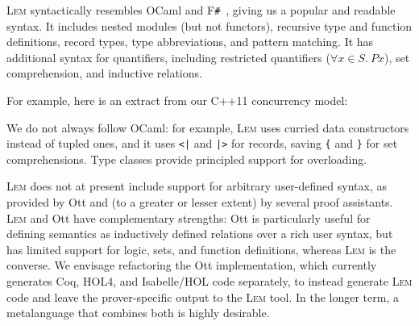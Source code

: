 \documentclass[a4paper]{llncs}
\newcommand{\myparagraph}[1]{\vspace{0.5\baselineskip}\par\noindent{\normalsize\bfseries{#1}}\quad}
\newcommand{\Lem}{\textsc{Lem}}
\begin{document}
\myparagraph{1. Readability of source files}
\Lem{} syntactically resembles OCaml and F\texttt{\#}~\cite{fsharp}, giving us a
popular and readable syntax.  It includes nested modules (but not functors),
recursive type and function definitions, record types, type abbreviations, and
pattern matching.  It has additional syntax for quantifiers, including
restricted quantifiers ($\forall x \in S.\ P x$), set comprehension, and
inductive relations. 

For example, here is an extract from our C++11 concurrency model:
\par{}
\noindent We do not always follow OCaml: for example, \Lem{} uses curried data
constructors instead of tupled ones, and it uses \verb+<|+ and \verb+|>+ for
records, saving \verb|{| and \verb|}| for set comprehensions.  Type classes
provide principled support for overloading.

\Lem{} does not at present include support for arbitrary
user-defined syntax, as provided by Ott and (to a greater or lesser
extent) by several proof assistants.
%
\Lem{} and Ott have complementary strengths:  Ott is particularly useful for
defining semantics as inductively defined relations over a rich user syntax, but
has limited support for logic, sets, and function definitions, whereas \Lem{} is
the converse.  We envisage refactoring the Ott implementation, which currently
generates Coq, HOL4, and Isabelle/HOL code separately, to instead generate
\Lem{} code and leave the prover-specific output to the \Lem{} tool.  In the
longer term, a metalanguage that combines both is highly desirable.
\end{document}
